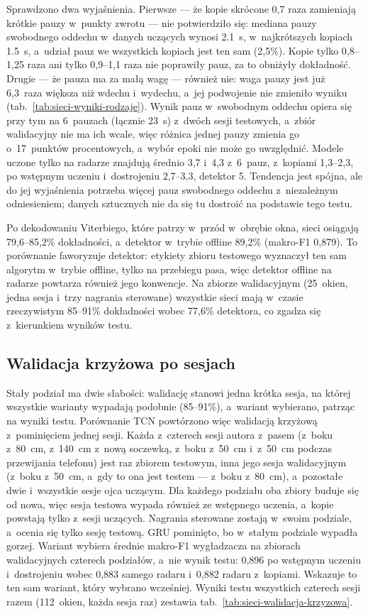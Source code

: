 \documentclass[12pt,a4paper,oneside]{report}
\begin{document}
Sprawdzono dwa wyjaśnienia. Pierwsze --- że kopie skrócone 0,7 raza zamieniają krótkie
pauzy w~punkty zwrotu --- nie potwierdziło się: mediana pauzy swobodnego oddechu w~danych
uczących wynosi \SI{2.1}{s}, w~najkrótszych kopiach \SI{1.5}{s}, a~udział pauz we wszystkich
kopiach jest ten sam (2,5\%). Kopie tylko 0,8--1,25 raza ani tylko 0,9--1,1 raza nie poprawiły
pauz, za to obniżyły dokładność. Drugie --- że pauza ma za małą wagę --- również nie: waga pauzy
jest już 6,3~raza większa niż wdechu i~wydechu, a~jej podwojenie nie zmieniło wyniku
(tab.~\ref{tab:sieci-wyniki-rodzaje}). Wynik pauz w~swobodnym oddechu opiera się przy tym na
6~pauzach (łącznie \SI{23}{s}) z~dwóch sesji testowych, a~zbiór walidacyjny nie ma ich wcale,
więc różnica jednej pauzy zmienia go o~17~punktów procentowych, a~wybór epoki nie może go
uwzględnić. Modele uczone tylko na radarze znajdują średnio 3,7 i~4,3 z~6~pauz, z~kopiami
1,3--2,3, po wstępnym uczeniu i~dostrojeniu 2,7--3,3, detektor 5. Tendencja jest spójna, ale do jej wyjaśnienia potrzeba więcej pauz
swobodnego oddechu z~niezależnym odniesieniem; danych sztucznych nie da się tu dostroić
na podstawie tego testu.

Po dekodowaniu Viterbiego, które patrzy w~przód w~obrębie okna, sieci osiągają
79,6--85,2\% dokładności, a~detektor w~trybie offline 89,2\% (makro-F1 0,879). To
porównanie faworyzuje detektor: etykiety zbioru testowego wyznaczył ten sam algorytm
w~trybie offline, tylko na przebiegu pasa, więc detektor offline na radarze powtarza
również jego konwencje. Na zbiorze walidacyjnym (25~okien, jedna sesja i~trzy nagrania
sterowane) wszystkie sieci mają w~czasie rzeczywistym 85--91\% dokładności wobec 77,6\%
detektora, co zgadza się z~kierunkiem wyników testu.

\subsection{Walidacja krzyżowa po sesjach}
\label{sec:sieci-walidacja-krzyzowa}
Stały podział ma dwie słabości: walidację stanowi jedna krótka sesja, na której wszystkie
warianty wypadają podobnie (85--91\%), a~wariant wybierano, patrząc na wyniki testu.
Porównanie TCN powtórzono więc walidacją krzyżową z~pominięciem jednej sesji. Każda z~czterech
sesji autora z~pasem (z~boku z~\SI{80}{cm}, z~\SI{140}{cm} z~nową soczewką, z~boku
z~\SI{50}{cm} i~z~\SI{50}{cm} podczas przewijania telefonu) jest raz zbiorem testowym,
inna jego sesja walidacyjnym (z~boku z~\SI{50}{cm}, a~gdy to ona jest testem --- z~boku
z~\SI{80}{cm}), a~pozostałe dwie i~wszystkie sesje ojca uczącym. Dla każdego podziału oba
zbiory buduje się od nowa, więc sesja testowa wypada również ze wstępnego uczenia, a~kopie
powstają tylko z~sesji uczących. Nagrania sterowane zostają w~swoim podziale, a~ocenia się
tylko sesję testową. GRU pominięto, bo w~stałym podziale wypadła gorzej. Wariant wybiera
średnie makro-F1 wygładzacza na zbiorach walidacyjnych czterech podziałów, a~nie wynik testu:
0,896 po wstępnym uczeniu i~dostrojeniu wobec 0,883 samego radaru i~0,882 radaru z~kopiami.
Wskazuje to ten sam wariant, który wybrano wcześniej. Wyniki testu wszystkich czterech sesji
razem (112~okien, każda sesja raz) zestawia tab.~\ref{tab:sieci-walidacja-krzyzowa}.
\end{document}
